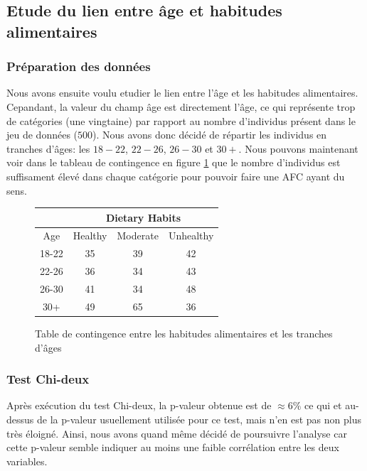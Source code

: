 \subsection{Etude du lien entre âge et habitudes alimentaires}

\subsubsection{Préparation des données}

Nous avons ensuite voulu etudier le lien entre l'âge et les habitudes alimentaires.
Cepandant, la valeur du champ âge est directement l'âge, ce qui représente trop de catégories (une vingtaine) par rapport au nombre d'individus présent dans le jeu de données ($500$).
Nous avons donc décidé de répartir les individus en tranches d'âges: les $18-22$, $22-26$, $26-30$ et $30+$.
Nous pouvons maintenant voir dans le tableau de contingence en figure \ref{tab:contTableAgeDietary} que le nombre d'individus est suffisament élevé dans chaque catégorie pour pouvoir faire une AFC ayant du sens.

\begin{figure}[!h]
\begin{center}
  \begin{tabular}{|c|c|c|c|}
    \hline 
    & \multicolumn{3}{|c|}{Dietary Habits}\\ 
    \hline
    Age & Healthy & Moderate & Unhealthy \\ 
    \hline 
    18-22 & 35 & 39 & 42 \\ 
    \hline 
    22-26 & 36 & 34 & 43 \\ 
    \hline 
    26-30 & 41 & 34 & 48 \\ 
    \hline 
    30+ & 49 & 65 & 36 \\ 
    \hline
  \end{tabular}
\end{center}
\caption{Table de contingence entre les habitudes alimentaires et les tranches d'âges}
\label{tab:contTableAgeDietary}
\end{figure}

\subsubsection{Test Chi-deux}

Après exécution du test Chi-deux, la p-valeur obtenue est de $\approx6\%$ ce qui et au-dessus de la p-valeur usuellement utilisée pour ce test, mais n'en est pas non plus très éloigné.
Ainsi, nous avons quand même décidé de poursuivre l'analyse car cette p-valeur semble indiquer au moins une faible corrélation entre les deux variables.

